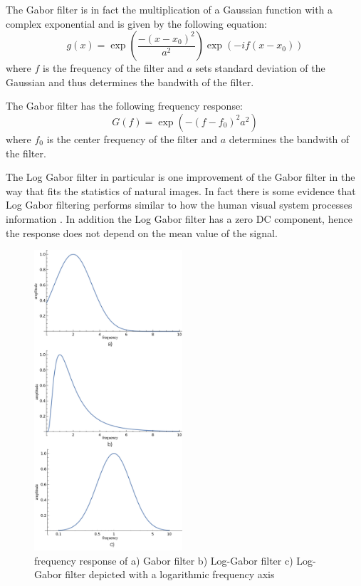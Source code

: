 \documentclass[journal]{IEEEtran}
\begin{document}
The Gabor filter is in fact the multiplication of a Gaussian function with a complex exponential and is given by the following equation:
\[
	g(x) = \exp\left( \frac{-(x-x_0)^2}{a^2}\right)\exp{(-i f(x-x_0))}
\]
where $f$ is the frequency of the filter and $a$ sets standard deviation of the Gaussian and thus determines the bandwith of the filter.

The Gabor filter has the following frequency response:
\[
	G(f) = \exp{(-(f-f_0)^2 a^2)}
\]
where $f_0$ is the center frequency of the filter and $a$ determines the bandwith of the filter.

The Log Gabor filter in particular is one improvement of the Gabor filter in the way that fits the statistics of natural images. In fact there is some evidence that Log Gabor filtering performs similar to how the human visual system processes information \cite{field1987}\cite{daugman1985uncertainty}. In addition the Log Gabor filter has a zero DC component, hence the response does not depend on the mean value of the signal.

\begin{figure}[t]
	\centering
  \includegraphics[width=0.49\textwidth]{iris/freq_response_gabor.png}
	\caption{frequency response of  a) Gabor filter b) Log-Gabor filter c) Log-Gabor filter depicted with a logarithmic frequency axis}
	\label{fig:frequency_response}
\end{figure}
\end{document}
